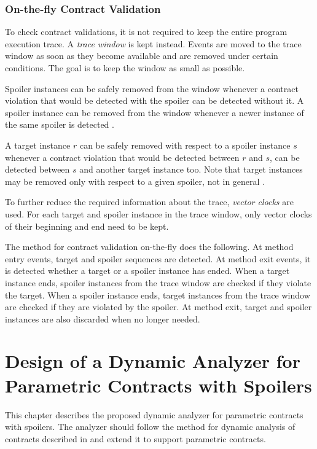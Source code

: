 
\subsection{On-the-fly Contract Validation}

To check contract validations, it is not required to keep the entire program
execution trace. A \emph{trace window} is kept instead. Events are moved to the
trace window as soon as they become available and are removed under certain
conditions. The goal is to keep the window as small as possible.

Spoiler instances can be safely removed from the window whenever a contract
violation that would be detected with the spoiler can be detected without it. A
spoiler instance can be removed from the window whenever a newer instance of the
same spoiler is detected \cite{contracts}.

A target instance $r$ can be safely removed with respect to a spoiler instance
$s$ whenever a contract violation that would be detected between $r$ and $s$,
can be detected between $s$ and another target instance too. Note that target
instances may be removed only with respect to a given spoiler, not in general
\cite{contracts}.

To further reduce the required information about the trace, \emph{vector clocks}
are used. For each target and spoiler instance in the trace window, only vector
clocks of their beginning and end need to be kept.

The method for contract validation on-the-fly does the following. At method
entry events, target and spoiler sequences are detected. At method exit events,
it is detected whether a target or a spoiler instance has ended. When a target
instance ends, spoiler instances from the trace window are checked if they
violate the target. When a spoiler instance ends, target instances from the
trace window are checked if they are violated by the spoiler. At method exit,
target and spoiler instances are also discarded when no longer needed.



\chapter{Design of a Dynamic Analyzer for Parametric Contracts with Spoilers}
\label{chFour}

This chapter describes the proposed dynamic analyzer for parametric contracts
with spoilers. The analyzer should follow the method for dynamic analysis of
contracts described in \cite{contracts} and extend it to support parametric
contracts.

